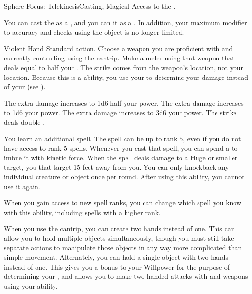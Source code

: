   \begin{magicalfeat}{Sphere Focus: Telekinesis}{Casting, Magical}
    \featpre Access to the  .

     You can cast the   as a , and you can  it as a .
    In addition, your maximum modifier to accuracy and checks using the object is no longer limited.

    \begin{magicalactiveability}{Violent Hand}
      \abilityusagetime Standard action.
      \rankline
      Choose a weapon you are proficient with and currently controlling using the  cantrip.
      Make a melee  using that weapon that deals  equal to half your .
      The strike comes from the weapon's location, not your location.
      Because this is a \magical ability, you use your  to determine your damage instead of your  (see ).

      \rankline
       The extra damage increases to 1d6 \add half your power.
       The extra damage increases to 1d6 \add your power.
       The extra damage increases to 3d6 \add your power.
       The strike deals double .
    \end{magicalactiveability}

     You learn an additional spell.
    The spell can be up to rank 5, even if you do not have access to rank 5 spells.
    Whenever you cast that spell, you can spend a  to  imbue it with kinetic force.
    When the spell deals damage to a Huge or smaller target, you  that target 15 feet away from you.
    You can only knockback any individual creature or object once per round.
    After using this ability, you  cannot use it again.

    When you gain access to new spell ranks, you can change which spell you know with this ability, including spells with a higher rank.

     When you use the  cantrip, you can create two hands instead of one.
    This can allow you to hold multiple objects simultaneously, though you must still take separate actions to manipulate those objects in any way more complicated than simple movement.
    Alternately, you can hold a single object with two hands instead of one.
    This gives you a  bonus to your Willpower for the purpose of determining your , and allows you to make two-handed attacks with  and  weapons using your  ability.
  \end{magicalfeat}

